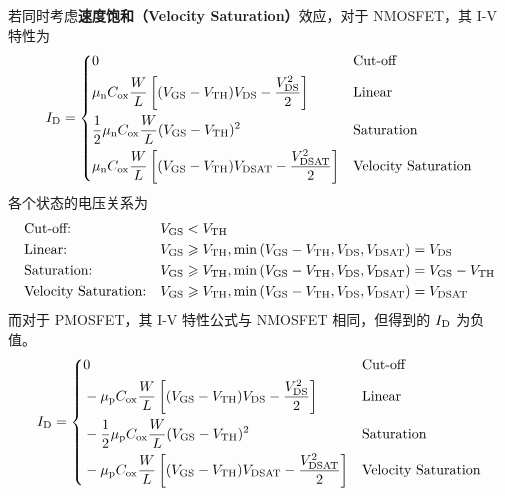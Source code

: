若同时考虑\textbf{速度饱和（Velocity Saturation）}效应，对于 NMOSFET，其 I-V 特性为
\begin{equation}
    I_{\rm{D}} = 
    \begin{dcases}  %
        \begin{aligned}
            & 0 && \text{Cut-off} \\
            & \mu_{\rm{n}} C_{\rm{ox}} \frac{W}{L} \left[ (V_{\rm{GS}} - V_{\rm{TH}}) V_{\rm{DS}} - \frac{V_{\rm{DS}}^2}{2} \right] && \text{Linear} \\
            & \frac{1}{2} \mu_{\rm{n}} C_{\rm{ox}} \frac{W}{L} (V_{\rm{GS}} - V_{\rm{TH}})^2 && \text{Saturation} \\
            & \mu_{\rm{n}} C_{\rm{ox}} \frac{W}{L} \left[ (V_{\rm{GS}} - V_{\rm{TH}}) V_{\rm{DSAT}} - \frac{V_{\rm{DSAT}}^2}{2} \right] && \text{Velocity Saturation}
        \end{aligned}
    \end{dcases}
\end{equation}
各个状态的电压关系为
\begin{equation}
    \begin{aligned}
        & \text{Cut-off:} && V_{\rm{GS}} < V_{\rm{TH}} \\
        & \text{Linear:} && V_{\rm{GS}} \geqslant V_{\rm{TH}}, \min \left(V_{\rm{GS}} - V_{\rm{TH}}, V_{\rm{DS}}, V_{\rm{DSAT}}\right) = V_{\rm{DS}} \\
        & \text{Saturation:} && V_{\rm{GS}} \geqslant V_{\rm{TH}}, \min \left(V_{\rm{GS}} - V_{\rm{TH}}, V_{\rm{DS}}, V_{\rm{DSAT}}\right) = V_{\rm{GS}} - V_{\rm{TH}} \\
        & \text{Velocity Saturation:} && V_{\rm{GS}} \geqslant V_{\rm{TH}}, \min \left(V_{\rm{GS}} - V_{\rm{TH}}, V_{\rm{DS}}, V_{\rm{DSAT}}\right) = V_{\rm{DSAT}}
    \end{aligned}
\end{equation}
而对于 PMOSFET，其 I-V 特性公式与 NMOSFET 相同，但得到的 $I_{\rm{D}}$ 为负值。
\begin{equation}
    I_{\rm{D}} = 
    \begin{dcases}  %
        \begin{aligned}
            & 0 && \text{Cut-off} \\
            & -\mu_{\rm{p}} C_{\rm{ox}} \frac{W}{L} \left[ (V_{\rm{GS}} - V_{\rm{TH}}) V_{\rm{DS}} - \frac{V_{\rm{DS}}^2}{2} \right] && \text{Linear} \\
            & -\frac{1}{2} \mu_{\rm{p}} C_{\rm{ox}} \frac{W}{L} (V_{\rm{GS}} - V_{\rm{TH}})^2 && \text{Saturation} \\
            & -\mu_{\rm{p}} C_{\rm{ox}} \frac{W}{L} \left[ (V_{\rm{GS}} - V_{\rm{TH}}) V_{\rm{DSAT}} - \frac{V_{\rm{DSAT}}^2}{2} \right] && \text{Velocity Saturation}
        \end{aligned}
    \end{dcases}
\end{equation}
